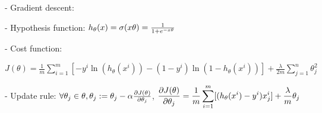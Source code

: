 - Gradient descent:

- Hypothesis function: $h_\theta(x)=\sigma(x\theta)=\large\frac{1}{1+e^{-x\theta}}$ 

- Cost function: 

$\displaystyle J(\theta)=\frac{1}{m}\sum^m_{i=1}[-y^i \ln (h_\theta(x^i))-(1-y^i) \ln (1-h_\theta(x^i))]+\frac{\lambda}{2m}\sum^n_{j=1}\theta_j^2$ 

- Update rule: $\forall \theta_j \in \theta, \theta_j := \theta_j-\alpha\large\frac{\partial J(\theta)}{\partial\theta_j}$, $\displaystyle \small\frac{\partial J(\theta)}{\partial\theta_j}=\frac{1}{m}\sum^m_{i=1}[(h_\theta(x^i)-y^i)x_j^i] + \frac \lambda m\theta_j$ 
